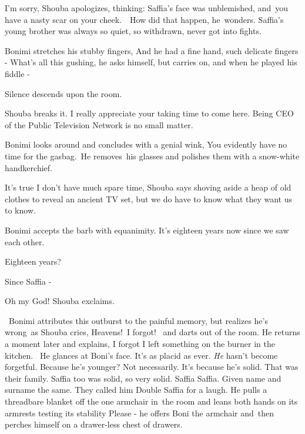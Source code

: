\documentclass[letterpaper]{article}
\begin{document}
{\textquotedbl}I'm sorry,{\textquotedbl} Shouba apologizes, thinking: Saffia's face was unblemished,
and\textcolor[rgb]{0.0,0.4392157,0.7529412}{\ }you have a nasty scar on your cheek.\ \ How did that happen,
he\ wonders. Saffia's young brother was always so quiet, so withdrawn, never got into fights.

Bonimi stretches his stubby fingers, {\textquotedbl}And he had a fine hand, such delicate fingers -{\textquotedbl}
What's all this gushing, he asks himself, but carries on, {\textquotedbl}and when he played his fiddle -{\textquotedbl}

Silence descends upon the room.

Shouba breaks it. {\textquotedbl}I really appreciate your taking time to come here. Being CEO of the Public Television
Network is no small matter.{\textquotedbl}

Bonimi looks around and concludes with a genial wink, {\textquotedbl}You evidently have no time for the
gasbag.{\textquotedbl}\ He removes~his glasses and polishes them with a snow{}-white handkerchief. 

{\textquotedbl}It's true I don't have much spare time,{\textquotedbl} Shouba says shoving aside a heap of old clothes to
reveal an ancient TV set, {\textquotedbl}but we do have to know what they want us to know.{\textquotedbl}

Bonimi accepts the barb with equanimity. {\textquotedbl}It's eighteen years now since we saw each other.{\textquotedbl} 

{\textquotedbl}Eighteen years?{\textquotedbl}

{\textquotedbl}Since Saffia -{\textquotedbl} 

{\textquotedbl}Oh my God!{\textquotedbl} Shouba exclaims.

~Bonimi attributes this outburst to the painful memory, but realizes he's wrong~as Shouba cries,
{\textquotedbl}Heavens!\textcolor[rgb]{0.0,0.4392157,0.7529412}{\ }I forgot!{\textquotedbl}
\textcolor[rgb]{0.0,0.4392157,0.7529412}{\ }and darts out of the room. He returns a moment later and explains,
{\textquotedbl}I forgot I left something on the burner in the kitchen.{\textquotedbl}~ He glances at Boni's face. It's
as placid as ever. \textit{He} hasn't become forgetful. Because he's younger? Not necessarily. It's because he's solid.
That was their family. Saffia too was solid, so very solid. Saffia Saffia. Given name and surname the same. They called
him {\textquotedbl}Double Saffia{\textquotedbl} for a laugh. He pulls a threadbare blanket off the one armchair in~the
room and leans both hands on its armrests testing its stability {\textquotedbl}Please -{\textquotedbl} he offers Boni
the armchair and\ then perches himself on a drawer-less chest of drawers. 
\end{document}
